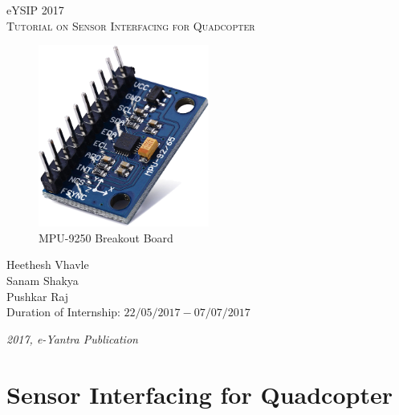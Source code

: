 \documentclass[a4paper,12pt,oneside]{book}
\begin{document}
\begin{titlepage}
\raggedright
{\Large eYSIP 2017\\[1cm]}
{\Huge \scshape Tutorial on Sensor Interfacing for Quadcopter \\[.1in]}

\vfill

\begin{figure}[!htb]
\centering
\includegraphics[width=0.5\textwidth]{images/mpu-9250-breakout}
\\MPU-9250 Breakout Board
\end{figure}

\vfill

\begin{flushright}
{\large Heethesh Vhavle \\}
{\large Sanam Shakya \\}
{\large Pushkar Raj \\}
\vspace{0.5cm}
{\large Duration of Internship: $ 22/05/2017-07/07/2017 $ \\}
\end{flushright}
\medskip

{\itshape 2017, e-Yantra Publication}
\end{titlepage}




\chapter[Sensor Interfacing for Quadcopter]{Sensor Interfacing for Quadcopter}
\end{document}
